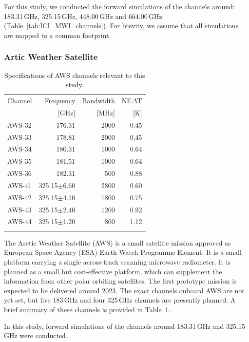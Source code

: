\documentclass[amt, manuscript]{copernicus}
\begin{document}
For this study, we conducted the forward simulations of the channels around: 183.31\,GHz, 325.15\,GHz, 448.00\,GHz and 664.00\,GHz (Table~\ref{tab:ICI_MWI_channels}). For brevity, we assume that all simulations are mapped to a common footprint.

\subsubsection{Artic Weather Satellite}
%
\begin{table}[t]
	\caption{Specifications of AWS channels relevant to this study.}
	\label{tab:specifications_AWS}	
	\begin{tabular}{lrrr}
		\tophline
		Channel & Frequency 	& Bandwidth & NE$\Delta$T \\
				& [GHz]			& [MHz]		& [K]		\\
		\middlehline
		AWS-32	&	176.31    & 2000	&	0.45	\\
		AWS-33	&	178.81    & 2000 	&	0.45\\
		AWS-34	&	180.31    & 1000 	&	0.64\\
		AWS-35	&	181.51    & 1000 	&	0.64 \\
		AWS-36	&	182.31    & \phantom{0}500  &	0.88 \\
		AWS-41  & 325.15$\pm$6.60    & 2800 	 &0.60\\
		AWS-42  & 325.15$\pm$4.10    & 1800    &0.75	\\
		AWS-43  & 325.15$\pm$2.40    & 1200    &0.92\\
		AWS-44  & 325.15$\pm$1.20    & \phantom{0}800  &1.12  \\
		\bottomhline
	\end{tabular}
	\belowtable{} %
\end{table}
The Arctic Weather Satellite (AWS) is a small satellite mission approved as European Space Agency (ESA)
Earth Watch Programme Element. It is a small platform carrying a single across-track scanning microwave radiometer. It is planned as a small but cost-effective platform, which can supplement the information from other polar orbiting satellites. The first prototype mission is expected to be delivered around 2023. The exact channels onboard AWS are not yet set, but five 183\,GHz and four 325\,GHz channels are presently planned. A brief summary of these channels is provided in Table~\ref{tab:specifications_AWS}.
 
In this study, forward simulations of the channels around 183.31\,GHz and 325.15\,GHz were conducted. 
\end{document}

